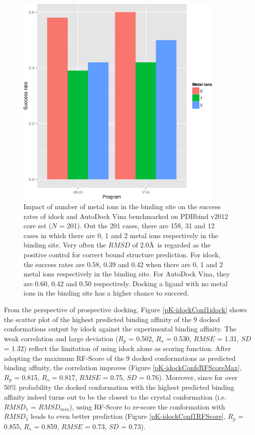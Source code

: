 \begin{figure}
\begin{center}
\includegraphics[width=4in]{../istar/Program-NIONS.eps}
\end{center}
\caption{Impact of number of metal ions in the binding site on the success rates of idock and AutoDock Vina benchmarked on PDBbind v2012 core set ($N$ = 201). Out the 201 cases, there are 158, 31 and 12 cases in which there are 0, 1 and 2 metal ions respectively in the binding site. Very often the $RMSD$ of 2.0\AA\ is regarded as the positive control for correct bound structure prediction. For idock, the success rates are 0.58, 0.39 and 0.42 when there are 0, 1 and 2 metal ions respectively in the binding site. For AutoDock Vina, they are 0.60, 0.42 and 0.50 respectively. Docking a ligand with no metal ions in the binding site has a higher chance to succeed.}
\label{Program-NIONS}
\end{figure}

From the perspective of prospective docking, Figure \ref{pK-idockConf1idock} shows the scatter plot of the highest predicted binding affinity of the 9 docked conformations output by idock against the experimental binding affinity. The weak correlation and large deviation ($R_p$ = 0.502, $R_s$ = 0.530, $RMSE$ = 1.31, $SD$ = 1.32) reflect the limitation of using idock alone as scoring function. After adopting the maximum RF-Score of the 9 docked conformations as predicted binding affinity, the correlation improves (Figure \ref{pK-idockConfsRFScoreMax}, $R_p$ = 0.815, $R_s$ = 0.817, $RMSE$ = 0.75, $SD$ = 0.76). Moreover, since for over 50\% probability the docked conformation with the highest predicted binding affinity indeed turns out to be the closest to the crystal conformation (i.e. $RMSD_1$ = $RMSD_{min}$), using RF-Score to re-score the conformation with $RMSD_1$ leads to even better prediction (Figure \ref{pK-idockConf1RFScore}, $R_p$ = 0.855, $R_s$ = 0.859, $RMSE$ = 0.73, $SD$ = 0.73).%

